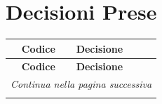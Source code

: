 \section{Decisioni Prese}

\renewcommand{\arraystretch}{1.3}
\vspace{-0.3cm}
\noindent
\begin{longtable}{c p{12cm}}
	\toprule
	\textbf{Codice} & \textbf{Decisione} \\
	\midrule
	\endfirsthead
 
	\toprule
	\textbf{Codice} & \textbf{Decisione} \\
	\midrule
	\endhead
 
	\midrule
	\multicolumn{2}{r}{\textit{Continua nella pagina successiva}} \\
	\midrule
	\endfoot
 
	\bottomrule
	\endlastfoot
 

\end{longtable}
